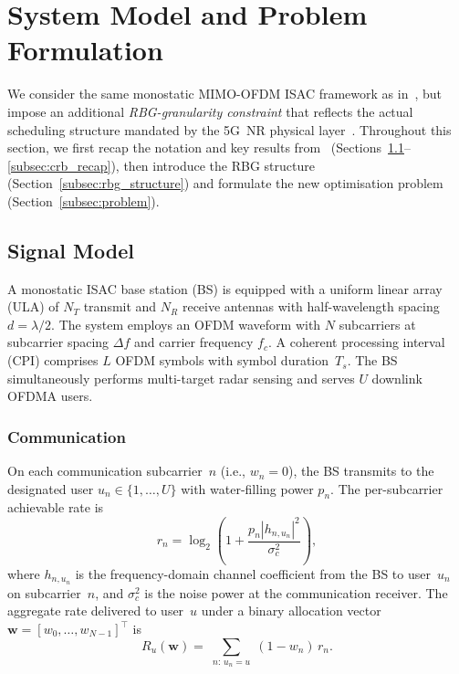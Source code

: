 
\section{System Model and Problem Formulation}
\label{sec:system}

We consider the same monostatic MIMO-OFDM ISAC framework as in~\cite{ldsa}, but impose an additional \emph{RBG-granularity constraint} that reflects the actual scheduling structure mandated by the 5G~NR physical layer~\cite{3gpp.38.214}.
Throughout this section, we first recap the notation and key results from~\cite{ldsa} (Sections~\ref{subsec:signal}--\ref{subsec:crb_recap}), then introduce the RBG structure (Section~\ref{subsec:rbg_structure}) and formulate the new optimisation problem (Section~\ref{subsec:problem}).

\subsection{Signal Model}
\label{subsec:signal}

A monostatic ISAC base station (BS) is equipped with a uniform linear array (ULA) of $N_T$ transmit and $N_R$ receive antennas with half-wavelength spacing $d = \lambda/2$.
The system employs an OFDM waveform with $N$ subcarriers at subcarrier spacing $\Delta f$ and carrier frequency $f_c$.
A coherent processing interval (CPI) comprises $L$ OFDM symbols with symbol duration~$T_s$.
The BS simultaneously performs multi-target radar sensing and serves $U$ downlink OFDMA users.

\subsubsection{Communication}
On each communication subcarrier~$n$ (i.e., $w_n = 0$), the BS transmits to the designated user $u_n \in \{1,\ldots,U\}$ with water-filling power $p_n$.
The per-subcarrier achievable rate is
\begin{equation}
  r_n = \log_2\!\left(1 + \frac{p_n |h_{n,u_n}|^2}{\sigma_c^2}\right),
  \label{eq:rate_sub}
\end{equation}
where $h_{n,u_n}$ is the frequency-domain channel coefficient from the BS to user~$u_n$ on subcarrier~$n$, and $\sigma_c^2$ is the noise power at the communication receiver.
The aggregate rate delivered to user~$u$ under a binary allocation vector $\mathbf{w} = [w_0, \ldots, w_{N-1}]^\top$ is
\begin{equation}
  R_u(\mathbf{w}) = \sum_{\substack{n:\, u_n = u}} (1 - w_n)\, r_n.
  \label{eq:rate_user}
\end{equation}

